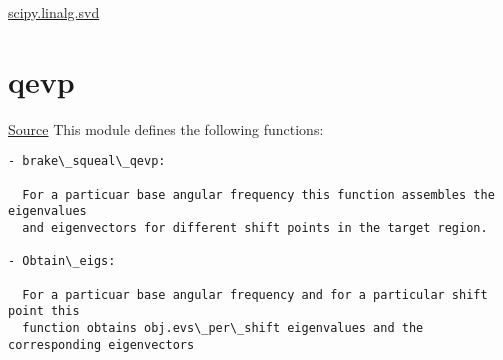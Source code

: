 \documentclass[letterpaper,10pt,english]{sphinxmanual}
\begin{document}


\href{http://docs.scipy.org/doc/scipy-0.14.0/reference/generated/scipy.linalg.svd.html}{scipy.linalg.svd}




\section{qevp}
\label{index:qevp}
\href{https://bitbucket.org/akadar/brakesqueal0.1/src/master/brake/solve/qevp.py?at=master}{Source}
\label{index:module-brake.solve.qevp}
This module defines the following functions:

\begin{Verbatim}[commandchars=\\\{\}]
- brake\_squeal\_qevp:

  For a particuar base angular frequency this function assembles the eigenvalues
  and eigenvectors for different shift points in the target region.
  
- Obtain\_eigs:
  
  For a particuar base angular frequency and for a particular shift point this 
  function obtains obj.evs\_per\_shift eigenvalues and the corresponding eigenvectors
\end{Verbatim}
\end{document}
